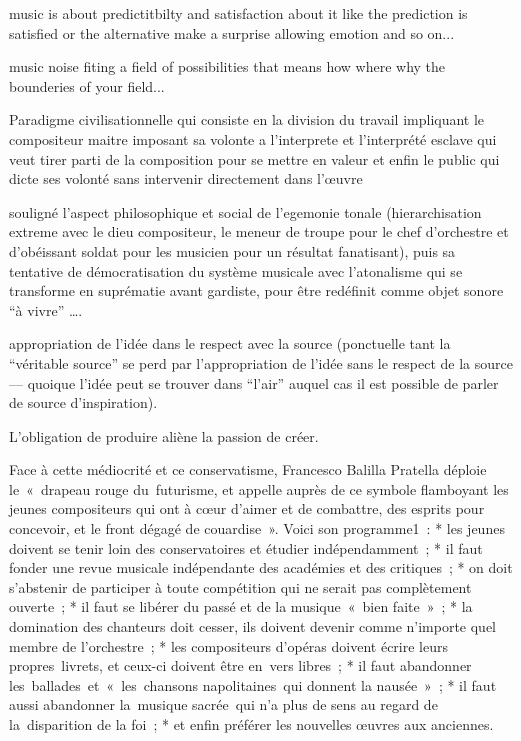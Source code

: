 music is about predictitbilty and satisfaction about it like the prediction is satisfied or the alternative make a surprise allowing emotion and so on...

music 
noise fiting a field of possibilities
that means how where why the bounderies of your field... 



Paradigme civilisationnelle qui consiste en la division du travail
impliquant le compositeur maitre imposant sa volonte a l’interprete
et l’interprété esclave qui veut tirer parti de la composition pour se mettre en valeur 
et enfin le public qui dicte ses volonté sans intervenir directement dans l’œuvre


souligné l’aspect philosophique et social de l’egemonie tonale (hierarchisation extreme avec le dieu compositeur, le meneur de troupe pour le chef d’orchestre et d’obéissant soldat pour les musicien pour un résultat fanatisant), puis sa tentative de démocratisation du système musicale avec l’atonalisme qui se transforme en suprématie avant gardiste, pour être redéfinit comme objet sonore “à vivre” ….


appropriation de l’idée dans le respect avec la source (ponctuelle tant la “véritable source” se perd par l’appropriation de l’idée sans le respect de la source — quoique l’idée peut se trouver dans “l’air” auquel cas il est possible de parler de source d’inspiration).


L’obligation de produire aliène la passion de créer. 

Face à cette médiocrité et ce conservatisme, Francesco Balilla Pratella déploie le « drapeau rouge du futurisme, et appelle auprès de ce symbole flamboyant les jeunes compositeurs qui ont à cœur d'aimer et de combattre, des esprits pour concevoir, et le front dégagé de couardise ».
Voici son programme1 :
* les jeunes doivent se tenir loin des conservatoires et étudier indépendamment ;
* il faut fonder une revue musicale indépendante des académies et des critiques ;
* on doit s'abstenir de participer à toute compétition qui ne serait pas complètement ouverte ;
* il faut se libérer du passé et de la musique « bien faite » ;
* la domination des chanteurs doit cesser, ils doivent devenir comme n'importe quel membre de l'orchestre ;
* les compositeurs d'opéras doivent écrire leurs propres livrets, et ceux-ci doivent être en vers libres ;
* il faut abandonner les ballades et « les chansons napolitaines qui donnent la nausée » ;
* il faut aussi abandonner la musique sacrée qui n'a plus de sens au regard de la disparition de la foi ;
* et enfin préférer les nouvelles œuvres aux anciennes.



